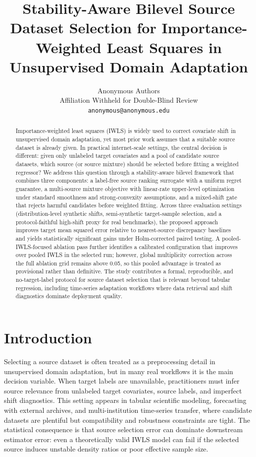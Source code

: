 \documentclass{article} %
\title{Stability-Aware Bilevel Source Dataset Selection for Importance-Weighted Least Squares in Unsupervised Domain Adaptation}
\author{Anonymous Authors \\
Affiliation Withheld for Double-Blind Review \\
\texttt{anonymous@anonymous.edu}}
\begin{document}
\maketitle

\begin{abstract}
Importance-weighted least squares (IWLS) is widely used to correct covariate shift in unsupervised domain adaptation, yet most prior work assumes that a suitable source dataset is already given. In practical internet-scale settings, the central decision is different: given only unlabeled target covariates and a pool of candidate source datasets, which source (or source mixture) should be selected before fitting a weighted regressor? We address this question through a stability-aware bilevel framework that combines three components: a label-free source ranking surrogate with a uniform regret guarantee, a multi-source mixture objective with linear-rate upper-level optimization under standard smoothness and strong-convexity assumptions, and a mixed-shift gate that rejects harmful candidates before weighted fitting. Across three evaluation settings (distribution-level synthetic shifts, semi-synthetic target-sample selection, and a protocol-faithful high-shift proxy for real benchmarks), the proposed approach improves target mean squared error relative to nearest-source discrepancy baselines and yields statistically significant gains under Holm-corrected paired testing. A pooled-IWLS-focused ablation pass further identifies a calibrated configuration that improves over pooled IWLS in the selected run; however, global multiplicity correction across the full ablation grid remains above 0.05, so this pooled advantage is treated as provisional rather than definitive. The study contributes a formal, reproducible, and no-target-label protocol for source dataset selection that is relevant beyond tabular regression, including time-series adaptation workflows where data retrieval and shift diagnostics dominate deployment quality.
\end{abstract}

\section{Introduction}
Selecting a source dataset is often treated as a preprocessing detail in unsupervised domain adaptation, but in many real workflows it is the main decision variable. When target labels are unavailable, practitioners must infer source relevance from unlabeled target covariates, source labels, and imperfect shift diagnostics. This setting appears in tabular scientific modeling, forecasting with external archives, and multi-institution time-series transfer, where candidate datasets are plentiful but compatibility and robustness constraints are tight. The statistical consequence is that source selection error can dominate downstream estimator error: even a theoretically valid IWLS model can fail if the selected source induces unstable density ratios or poor effective sample size.
\end{document}
